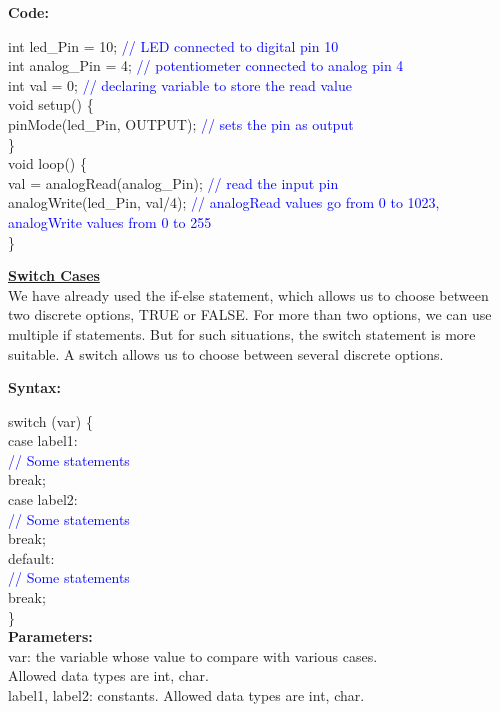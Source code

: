 \documentclass[12pt,a4paper]{article}
\begin{document}
\hspace{1.5cm}\textbf{\large Code:}\\[6pt]
\setlength{\parindent}{8eM}

int led\_Pin = 10; \textcolor{blue}{  // LED connected to digital pin 10}\\
int analog\_Pin = 4; \textcolor{blue}{  // potentiometer connected to analog pin 4}\\
int val = 0; \textcolor{blue}{ // declaring variable to store the read value}\\[9pt]
void setup() \{\\
  pinMode(led\_Pin, OUTPUT); \textcolor{blue}{ // sets the pin as output}\\
\}\\[9pt]
void loop() \{\\
  val = analogRead(analog\_Pin); \textcolor{blue}{ // read the input pin}\\
  analogWrite(led\_Pin, val/4); \textcolor{blue}{// analogRead values go from 0 to 1023,\\ analogWrite values from 0 to 255}\\
\}

\setlength{\parindent}{0eM}
\begin{justify}
\textbf{\underline{Switch Cases}}\\[3pt]
We have already used the if-else statement, which allows us to choose between two discrete options, TRUE or FALSE. For more than two options, we can use multiple if statements. But for such situations, the switch statement is more suitable. A switch allows us to choose between several discrete options.\end{justify}


\hspace{1.5cm}\textbf{\large Syntax:}\\[6pt]
\setlength{\parindent}{8eM}

switch (var) \{\\
  case label1:\\
    \textcolor{blue}{// Some statements}\\
    break;\\
  case label2:\\
    \textcolor{blue}{// Some statements}\\
    break;\\
  default:\\
    \textcolor{blue}{// Some statements}\\
    break;\\
\}\\[6pt]
\textbf{Parameters:}\\[3pt] 
var: the variable whose value to compare with various cases.\\ Allowed data types are int, char.\\
label1, label2: constants. Allowed data types are int, char.
\end{document}
